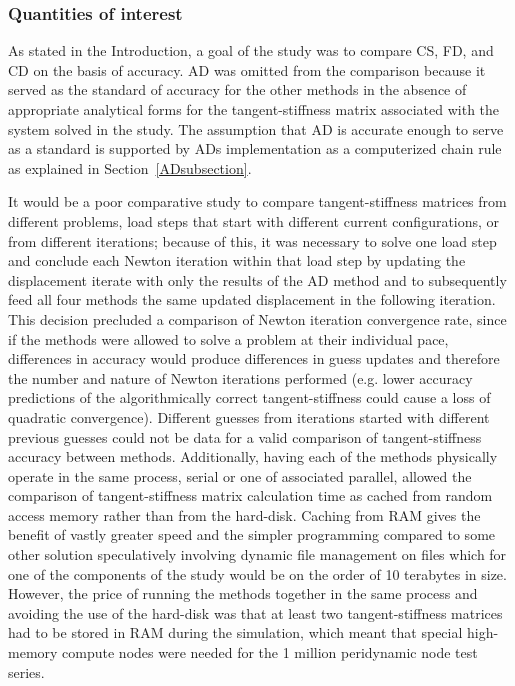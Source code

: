 \documentclass[preprint,12pt]{elsarticle}
\begin{document}
\subsubsection{Quantities of interest} 
\label{JGAM} 
As stated in the Introduction, a goal of the study was to compare CS, FD, and CD on the basis of accuracy. AD was omitted from the comparison because it served as the standard of accuracy for the other methods in the absence of appropriate analytical forms for the tangent-stiffness matrix associated with the system solved in the study. The assumption that AD is accurate enough to serve as a standard is supported by ADs implementation as a computerized chain rule as explained in Section~\ref{ADsubsection}.

It would be a poor comparative study to compare tangent-stiffness matrices from different problems, load steps that start with different current configurations, or from different iterations; because of this, it was necessary to solve one
load step and conclude each Newton iteration within that load step by updating the displacement iterate with only the results of the AD method and to subsequently feed all four methods the same updated displacement in the following iteration. This decision precluded a comparison of Newton iteration convergence rate, since if the methods were allowed to solve a problem at their individual pace, differences in accuracy would produce differences in guess updates and therefore the number and nature of Newton iterations performed (e.g. lower accuracy predictions of the algorithmically correct tangent-stiffness could cause a loss of quadratic convergence).  Different guesses from iterations started with different previous guesses could not be data for a valid comparison of tangent-stiffness accuracy between methods.  Additionally, having each of the methods physically operate in the same process, serial or one of associated parallel, allowed the comparison of tangent-stiffness matrix calculation time as cached from random access memory rather than from the hard-disk.  Caching from RAM gives the benefit of vastly greater speed and the simpler programming compared to some other solution speculatively involving dynamic file management on files which for one of the components of the study would be on the order of 10 terabytes in size. However, the price of running the methods together in the same process and avoiding the use of the hard-disk was that at least two tangent-stiffness matrices had to be stored in RAM during the simulation, which meant that special high-memory compute nodes were needed for the 1 million peridynamic node test series.
\end{document}
